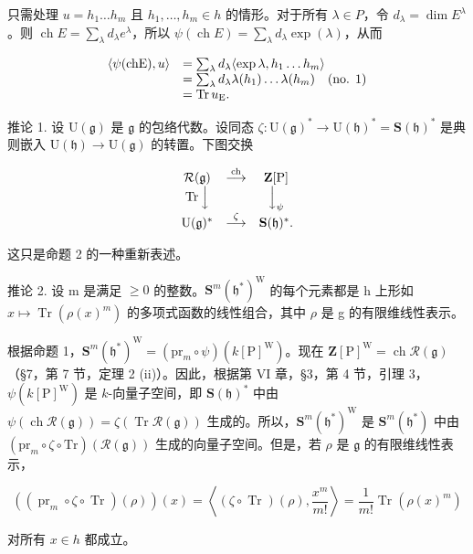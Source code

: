 只需处理 \(u = h_{1} \ldots h_{m}\) 且 \(h_{1}, \ldots, h_{m} \in h\) 的情形。对于所有 \(\lambda \in P\)，令 \(d_{\lambda} = \dim E^{\lambda}\)。则 \(\operatorname{ch} E = \sum_{\lambda} d_{\lambda} e^{\lambda}\)，所以 \(\psi(\operatorname{ch} E) = \sum_{\lambda} d_{\lambda} \exp(\lambda)\)，从而

\[
\begin{array}{r l} \langle \psi (\mathrm{chE}), u \rangle & = \sum_ {\lambda} d _ {\lambda} \langle \exp \lambda , h _ {1} \dots h _ {m} \rangle \\ & = \sum_ {\lambda} d _ {\lambda} \lambda (h _ {1}) \dots \lambda (h _ {m}) \quad (\text {no. 1}) \\ & = \operatorname{Tr} u _ {\mathrm{E}}. \end{array}
\]

推论 1. 设 \(\mathrm{U}(\mathfrak{g})\) 是 \(\mathfrak{g}\) 的包络代数。设同态 \(\zeta : \mathrm{U}(\mathfrak{g})^* \to \mathrm{U}(\mathfrak{h})^* = \mathbf{S}(\mathfrak{h})^*\) 是典则嵌入 \(\mathrm{U}(\mathfrak{h}) \to \mathrm{U}(\mathfrak{g})\) 的转置。下图交换

\[
\begin{array}{c c c} \mathcal {R} (\mathfrak {g}) & \stackrel {{\text {ch}}} {{\longrightarrow}} & \mathbf {Z} [ \mathrm{P} ] \\ \operatorname{Tr} \Big \downarrow & & \Big \downarrow_ {\psi} \\ \mathrm{U} (\mathfrak {g}) ^ {*} & \stackrel {{\zeta}} {{\longrightarrow}} & \mathbf {S} (\mathfrak {h}) ^ {*}. \end{array}
\]

这只是命题 2 的一种重新表述。

推论 2. 设 m 是满足 \(\geq 0\) 的整数。\(\mathbf{S}^{m}(\mathfrak{h}^{*})^{\mathrm{W}}\) 的每个元素都是 h 上形如 \(x \mapsto \operatorname{Tr}(\rho(x)^{m})\) 的多项式函数的线性组合，其中 \(\rho\) 是 g 的有限维线性表示。

根据命题 1，\(\mathbf{S}^m (\mathfrak{h}^*)^{\mathrm{W}} = (\mathrm{pr}_m\circ \psi)(k[\mathrm{P}]^{\mathrm{W}})\)。现在 \(\mathbf{Z}[\mathrm{P}]^{\mathrm{W}} = \operatorname {ch}\mathcal{R}(\mathfrak{g})\)（§7，第 7 节，定理 2 (ii)）。因此，根据第 VI 章，§3，第 4 节，引理 3，\(\psi (k[\mathrm{P}]^{\mathrm{W}})\) 是 \(k\)-向量子空间，即 \(\mathbf{S}(\mathfrak{h})^{*}\) 中由 \(\psi (\operatorname {ch}\mathcal{R}(\mathfrak{g})) = \zeta (\operatorname {Tr}\mathcal{R}(\mathfrak{g}))\) 生成的。所以，\(\mathbf{S}^m (\mathfrak{h}^*)^{\mathrm{W}}\) 是 \(\mathbf{S}^m (\mathfrak{h}^*)\) 中由 \((\mathrm{pr}_m\circ \zeta \circ \mathrm{Tr})(\mathcal{R}(\mathfrak{g}))\) 生成的向量子空间。但是，若 \(\rho\) 是 \(\mathfrak{g}\) 的有限维线性表示，

\[
((\operatorname{pr} _ {m} \circ \zeta \circ \operatorname{Tr}) (\rho)) (x) = \left\langle (\zeta \circ \operatorname{Tr}) (\rho), \frac {x ^ {m}}{m !} \right\rangle = \frac {1}{m !} \operatorname{Tr} (\rho (x) ^ {m})
\]

对所有 \(x \in h\) 都成立。

